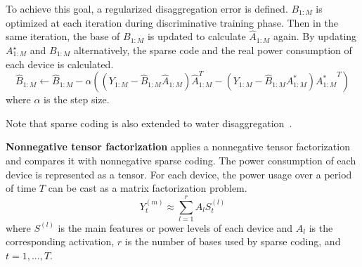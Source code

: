 To achieve this goal, a regularized disaggregation error is defined. 
$B_{1:M}$ is optimized at each iteration during
discriminative training phase. 
Then in the same iteration,
the base of $B_{1:M}$ is updated to calculate $\hat{A}_{1:M}$ again.
By updating $A_{1:M}^\star$ and $B_{1:M}$ alternatively,
the sparse code and the real power consumption of each device 
is calculated.
\begin{equation}
 \hat{B}_{1:M} \leftarrow \hat{B}_{1:M} - \alpha ((Y_{1:M}-\hat{B}_{1:M}\hat{A}_{1:M}) \hat{A}^T_{1:M} - (Y_{1:M}-\hat{B}_{1:M}A^*_{1:M}){A^*_{1:M}}^T) 
 \end{equation}
where $\alpha$ is the step size. 



Note that sparse coding is also extended to water disaggregation~\cite{Dong2013deep}.

\textbf{Nonnegative tensor factorization}
\cite{figueiredo2014electrical} applies a nonnegative tensor factorization and compares it with 
nonnegative sparse coding. 
The power consumption of each device is represented as a tensor. 
For each device, the power usage over a period of time $T$ can be cast as 
a matrix factorization problem. 
\begin{equation}
Y_t^{(m)} \approx \sum_{l=1}^r A_l S_t^{(l)}
\end{equation}
where $S^{(l)}$ is the main features or power levels of each device and $A_l$ is the corresponding activation, 
$r$ is the number of bases used by sparse coding, and $t=1,...,T$.

